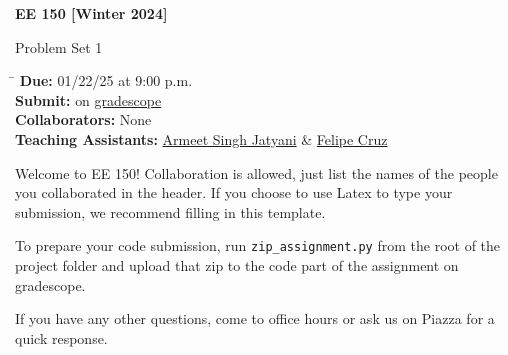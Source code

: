 




\begin{Large}
    \textsf{\textbf{EE 150 [Winter 2024]}}
    
    \textsf{Problem Set 1}
\end{Large}

\vspace{1ex}

\begin{tabbing}
    \hspace{10em} \= \kill
    \textsf{\textbf{Due:}} \> \textsf{01/22/25 at 9:00 p.m.} \\
    \textsf{\textbf{Submit:}} \> \textsf{on \href{https://gradescope.com}{gradescope}} \\
    \textsf{\textbf{Collaborators:}} \> \textsf{None} \\
    \textsf{\textbf{Teaching Assistants:}} \> \href{https://armeet.ca}{Armeet Singh Jatyani} \& \href{https://github.com/PipeCruz}{Felipe Cruz}
\end{tabbing}


\vspace{2ex}

Welcome to EE 150! Collaboration is allowed, just list the names of the people
you collaborated in the header. If you choose to use Latex to type your
submission, we recommend filling in this template.

To prepare your code submission, run \verb|zip_assignment.py| from the root of
the project folder and upload that zip to the code part of the assignment on
gradescope.

If you have any other questions, come to office hours or ask us on Piazza for a
quick response.







\newpage

\vfill





